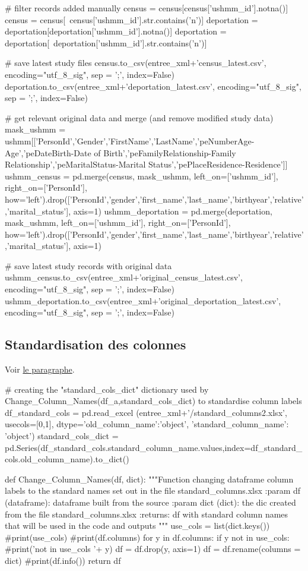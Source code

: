\documentclass[a4paper,12pt,twoside]{book}
\begin{document}
\begin{python}
# filter records added manually
census = census[census['ushmm_id'].notna()]
census = census[~census['ushmm_id'].str.contains('n')]
deportation = deportation[deportation['ushmm_id'].notna()]
deportation = deportation[~deportation['ushmm_id'].str.contains('n')]

# save latest study files
census.to_csv(entree_xml+'census_latest.csv', encoding="utf_8_sig", sep = ';', index=False)
deportation.to_csv(entree_xml+'deportation_latest.csv', encoding="utf_8_sig", sep = ';', index=False)

# get relevant original data and merge (and remove modified study data)
mask_ushmm = ushmm[['PersonId','Gender','FirstName','LastName','peNumberAge-Age','peDateBirth-Date of Birth','peFamilyRelationship-Family Relationship','peMaritalStatus-Marital Status','pePlaceResidence-Residence']]
ushmm_census = pd.merge(census, mask_ushmm, left_on=['ushmm_id'], right_on=['PersonId'], how='left').drop(['PersonId','gender','first_name','last_name','birthyear','relative','marital_status'], axis=1)
ushmm_deportation = pd.merge(deportation, mask_ushmm, left_on=['ushmm_id'], right_on=['PersonId'], how='left').drop(['PersonId','gender','first_name','last_name','birthyear','relative','marital_status'], axis=1)

# save latest study records with original data
ushmm_census.to_csv(entree_xml+'original_census_latest.csv', encoding="utf_8_sig", sep = ';', index=False)
ushmm_deportation.to_csv(entree_xml+'original_deportation_latest.csv', encoding="utf_8_sig", sep = ';', index=False)    		    
    		    \end{python}
    		    \pagebreak
            
            \subsection{Standardisation des colonnes}
            
    		    Voir \hyperref[stdcol]{le paragraphe}.
                \label{stdcol_code}
    		    \begin{python}
# creating the "standard_cols_dict" dictionary used by Change_Column_Names(df_a,standard_cols_dict) to standardise column labels
  df_standard_cols = pd.read_excel (entree_xml+'/standard_columns2.xlsx', usecols=[0,1], dtype={'old_column_name':'object', 'standard_column_name': 'object'})
  standard_cols_dict = pd.Series(df_standard_cols.standard_column_name.values,index=df_standard_cols.old_column_name).to_dict()

def Change_Column_Names(df, dict):
  """Function changing dataframe column labels to the standard names set out in the file standard_columns.xlsx
  :param df (dataframe): dataframe built from the source
  :param dict (dict): the dic created from the file standard_columns.xlsx
  :returns: df with standard column names that will be used in the code and outputs
  """
  use_cols = list(dict.keys())
  #print(use_cols)
  #print(df.columns)
  for y in df.columns:
    if y not in use_cols:
      #print('not in use_cols '+ y)
      df = df.drop(y, axis=1)
  df = df.rename(columns = dict)
  #print(df.info())
  return df
    		    \end{python}
    		    \pagebreak
    		    
\end{document}
